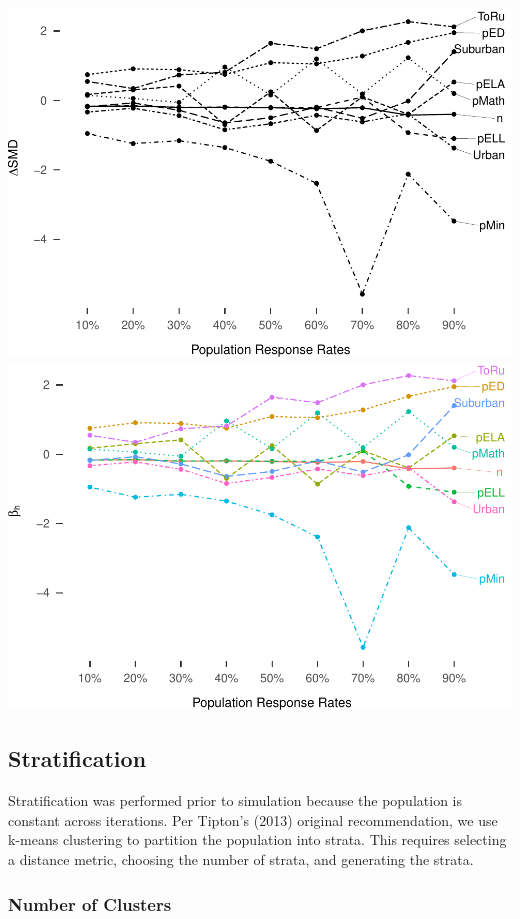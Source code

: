 \documentclass[man,floatsintext]{apa6}
\begin{document}
\includegraphics{GenSamp_Paper_files/figure-latex/fig-RGM-Pars-1.pdf} \includegraphics{GenSamp_Paper_files/figure-latex/fig-RGM-Pars-2.pdf}

\hypertarget{stratification}{%
\subsection{Stratification}\label{stratification}}

Stratification was performed prior to simulation because the population is constant across iterations. Per Tipton's (2013) original recommendation, we use k-means clustering to partition the population into strata. This requires selecting a distance metric, choosing the number of strata, and generating the strata.

\hypertarget{number-of-clusters}{%
\subsubsection{Number of Clusters}\label{number-of-clusters}}
\end{document}
